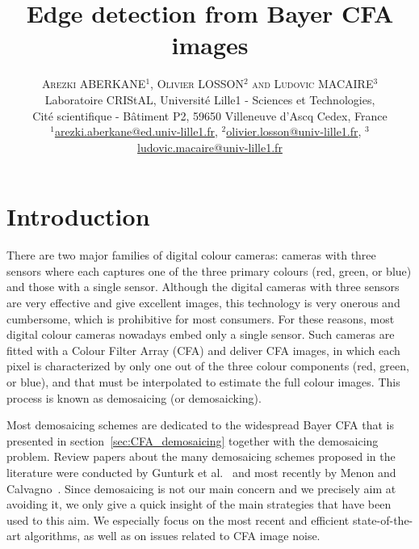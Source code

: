 \documentclass[twoside]{article}
\title{\vspace{-15mm}\fontsize{24pt}{10pt}\selectfont\textbf{Edge detection from Bayer CFA images}} %
\author{
\large
\textsc{Arezki ABERKANE$^{1}$, Olivier LOSSON$^{2}$ and Ludovic MACAIRE$^{3}$}\\[2mm] %
\normalsize Laboratoire CRIStAL, Universit\'e Lille1 - Sciences et Technologies,\\ \normalsize Cit\'e scientifique - B\^atiment P2, 59650 Villeneuve d'Ascq Cedex, France \\ %
\normalsize \href{mailto:arezki.aberkane@ed.univ-lille1.fr}{$^{1}$arezki.aberkane@ed.univ-lille1.fr},  
\href{mailto:olivier.losson@univ-lille1.fr}{$^{2}$olivier.losson@univ-lille1.fr},  
\href{mailto:ludovic.macaire@univ-lille1.fr}{$^{3}$ludovic.macaire@univ-lille1.fr} %
\vspace{-5mm}
}
\date{}
\begin{document}
\maketitle %



\begin{abstract}
  

\end{abstract}



\section{Introduction}

There are two major families of digital colour cameras: cameras with three sensors where each captures one of the three primary colours (red, green, or blue) and those with a single sensor. Although the digital cameras with three sensors are very effective and give  excellent images,  this technology is very onerous and cumbersome, which is prohibitive for most consumers. For these reasons, most digital colour cameras nowadays embed only a single sensor. Such cameras are fitted with a Colour Filter Array (CFA) and deliver CFA images, in which each pixel is characterized by only one out of the three colour components (red, green, or blue), and that must be interpolated to estimate the full colour images. This process is known as demosaicing (or demosaicking).

Most demosaicing schemes are dedicated to the widespread Bayer CFA that is presented in section~\ref{sec:CFA_demosaicing} together with the demosaicing problem. Review papers about the many demosaicing schemes proposed in the literature were conducted by Gunturk et al.~\cite{gunturk_ip_2002,li_vcip_2008} and most recently by Menon and Calvagno~\cite{menon_ic_2011}. Since demosaicing is not our main concern and we precisely aim at avoiding it, we only give a quick insight of the main strategies that have been used to this aim. We especially focus on the most recent and efficient state-of-the-art algorithms, as well as on issues related to CFA image noise.
\end{document}
